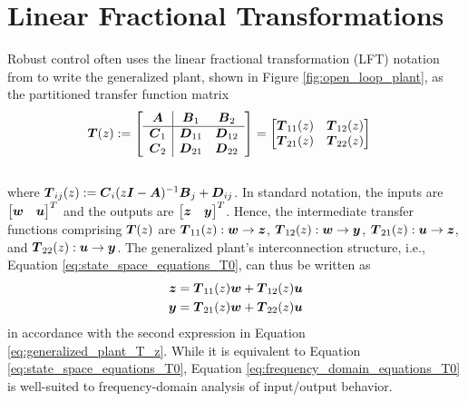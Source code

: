 \section{Linear Fractional Transformations}
Robust control often uses the linear fractional transformation (LFT) notation from \cite{doyle1991review} to write the generalized plant, shown in Figure \ref{fig:open_loop_plant}, as the partitioned transfer function matrix
\begin{equation}
\label{eq:generalized_plant_T_z}
\begin{aligned}
	\vb*{T}(z) &:=
	\begin{bmatrix}
	\begin{array}{c|cc}
		\vb*{A} & \vb*{B}_{1} & \vb*{B}_{2}\\
		\hline
		\vb*{C}_{1} & \vb*{D}_{11} & \vb*{D}_{12}\\
		\vb*{C}_{2} & \vb*{D}_{21} & \vb*{D}_{22}\\
	\end{array}
	\end{bmatrix}
	=
	\begin{bmatrix}
		\vb*{T}_{11}(z) & \vb*{T}_{12}(z)\\
		\vb*{T}_{21}(z) & \vb*{T}_{22}(z)\\
	\end{bmatrix}
\end{aligned}
\vspace{-10pt}
\end{equation}\\
where $\vb*{T}_{ij}(z) := \vb*{C}_{i}(z\vb*{I} - \vb*{A})^{-1}\vb*{B}_{j} + \vb*{D}_{ij}$.  In standard notation, the inputs are $\begin{bmatrix} \vb*{w} & \vb*{u} \end{bmatrix}^{T}$ and the outputs are $\begin{bmatrix} \vb*{z} & \vb*{y} \end{bmatrix}^{T}$.  Hence, the intermediate transfer functions comprising $\vb*{T}(z)$ are $\vb*{T}_{11}(z): \vb*{w} \rightarrow \vb*{z}$, $\vb*{T}_{12}(z): \vb*{w} \rightarrow \vb*{y}$, $\vb*{T}_{21}(z): \vb*{u} \rightarrow \vb*{z}$, and $\vb*{T}_{22}(z): \vb*{u} \rightarrow \vb*{y}$.  The generalized plant's interconnection structure, i.e., Equation \eqref{eq:state_space_equations_T0}, can thus be written as
\begin{subequations}
\label{eq:frequency_domain_equations_T0}
\begin{align}
	\vb*{z} = \vb*{T}_{11}(z)\vb*{w} + \vb*{T}_{12}(z)\vb*{u}\\
	\vb*{y} = \vb*{T}_{21}(z)\vb*{w} + \vb*{T}_{22}(z)\vb*{u}
\end{align}
\end{subequations}
in accordance with the second expression in Equation \eqref{eq:generalized_plant_T_z}.  While it is equivalent to Equation \eqref{eq:state_space_equations_T0}, Equation \eqref{eq:frequency_domain_equations_T0} is well-suited to frequency-domain analysis of input/output behavior.

